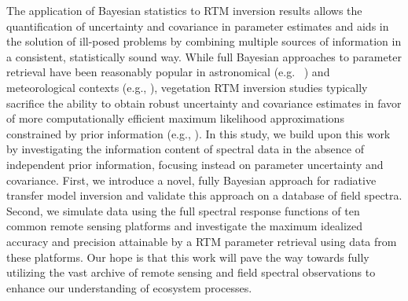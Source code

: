    The application of Bayesian statistics to RTM inversion results allows the
    quantification of uncertainty and covariance in parameter estimates and
    aids in the solution of ill-posed problems by combining multiple sources of
    information in a consistent, statistically sound way. While full Bayesian
    approaches to parameter retrieval have been reasonably popular in
    astronomical (e.g.~ \cite{Sliwa2014, Wilkman2014}) and meteorological
    contexts (e.g., \cite{DeLannoy2014, Liu2014a, Elsaesser2015}), vegetation
    RTM inversion studies typically sacrifice the ability to obtain robust
    uncertainty and covariance estimates in favor of more computationally
    efficient maximum likelihood approximations constrained by prior
    information (e.g., \cite{Yao2008, Lauvernet2008, Zhang2012, Laurent2014,
    Mousivand2014}). In this study, we build upon this work by investigating
    the information content of spectral data in the absence of independent
    prior information, focusing instead on parameter uncertainty and
    covariance.  First, we introduce a novel, fully Bayesian approach for
    radiative transfer model inversion and validate this approach on a database
    of field spectra.  Second, we simulate data using the full spectral
    response functions of ten common remote sensing platforms and investigate
    the maximum idealized accuracy and precision attainable by a RTM parameter
    retrieval using data from these platforms.  Our hope is that this work will
    pave the way towards fully utilizing the vast archive of remote sensing and
    field spectral observations to enhance our understanding of ecosystem
    processes.